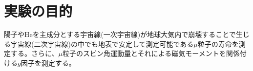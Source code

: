 \section{実験の目的}
陽子やHeを主成分とする宇宙線(一次宇宙線)が地球大気内で崩壊することで生じる宇宙線(二次宇宙線)の中でも地表で安定して測定可能である$\mu$粒子の寿命を測定する。さらに、$\mu$粒子のスピン角運動量とそれによる磁気モーメントを関係付ける$g$因子を測定する。
